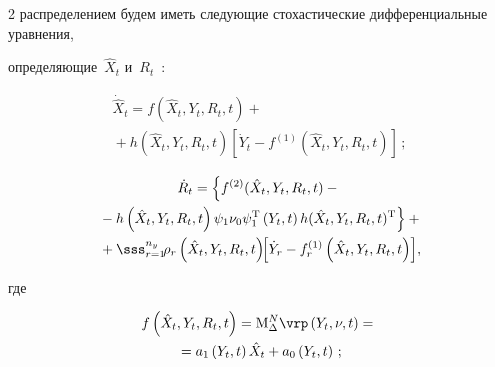 \begin{multicols}{2}
распределением будем иметь следующие стохастические дифференциальные уравнения,

определяющие~$\hat{X}_t$ и~$R_t$~\cite{1-sin}:



\noindent

    \begin{multline}

    \dot{\hat X}_t = f \left(\hat X_t, Y_t,R_t,t\right)+{}\\

    {}+

    h\left(\hat X_t,Y_t, R_t,t\right)

   \left[ \dot Y_t - f^{(1)} \left(\hat X_t,Y_t, R_t,t\right)\right]\,;\label{e20-sin}

    \end{multline}





    \vspace*{-12pt}



    \noindent

    \begin{multline}

    \dot R_t=\left\{ f^{(2)}(\hat X_t, Y_t,R_t,t)-{}\right.\\

    \left.{}-h\left(\hat

    X_t, Y_t,R_t,t\right)\psi_1\nu_0\psi_1^{\mathrm{T}} \left(Y_t,t\right)

 h ({\hat X}_t, Y_t,R_t,t)^{\mathrm{T}}\right\} +{}\\

 \hspace*{-1.7mm}{}+\sss_{r=1}^{n_y}\! \rho_r \left(\hat{X}_t,Y_t, R_t,t\right)\!\!\left[

    \dot Y_r -f_r^{(1)}\left({\hat X}_t,Y_t, R_t,t\right) \right]\!,\!\!\!\label{e21-sin}

    \end{multline}

где

    \begin{multline*}

    f\left(\hat X_t, Y_t,R_t,t\right)=

    \mathrm{M}^N_\Delta \vrp \left(Y_t, \nu,t\right)={}\\

     {}=a_1 \left(Y_t, t\right) \hat{X}_t + a_0 \left(Y_t, t\right)\,; %


\end{multline*}
\end{multicols}
